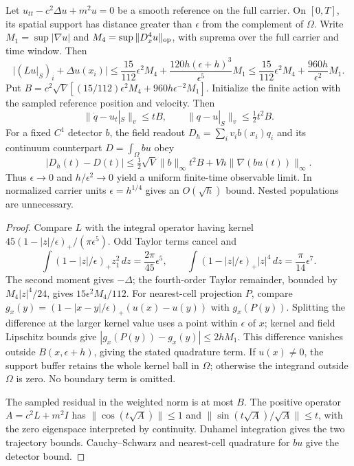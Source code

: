\begin{proposition}
\label{prop:source-metric-scalar-limit}
Let $u_{tt}-c^2\Delta u+m^2u=0$ be a smooth reference on the full carrier.
On $[0,T]$, its spatial support has distance greater than $\epsilon$ from
the complement of $\Omega$. Write
$M_1=\sup|\nabla u|$ and $M_4=\sup\|D_x^4u\|_{\rm op}$, with suprema
over the full carrier and time window. Then
\[
 \big|(Lu|_S)_i+\Delta u(x_i)\big|
 \le \frac{15}{112}\epsilon^2M_4+
     \frac{120h(\epsilon+h)^3}{\epsilon^5}M_1
 \le \frac{15}{112}\epsilon^2M_4+\frac{960h}{\epsilon^2}M_1.
\]
Put $B=c^2\sqrt V[(15/112)\epsilon^2M_4+960h\epsilon^{-2}M_1]$.
Initialize the finite action with the sampled reference position and velocity.
Then
\[
 \|\dot q-u_t|_S\|_v\le tB,\qquad
 \|q-u|_S\|_v\le\tfrac12t^2B.
\]
For a fixed $C^1$ detector $b$, the field readout
$D_h=\sum_i v_ib(x_i)q_i$ and its continuum counterpart
$D=\int_\Omega bu$ obey
\[
 |D_h(t)-D(t)|\le
 \tfrac12\sqrt V\|b\|_\infty t^2B+
 Vh\|\nabla(bu(t))\|_\infty.
\]
Thus $\epsilon\to0$ and $h/\epsilon^2\to0$ yield a uniform finite-time
observable limit. In normalized carrier units $\epsilon=h^{1/4}$ gives
an $O(\sqrt h)$ bound. Nested populations are unnecessary.
\end{proposition}
\begin{proof}
Compare $L$ with the integral operator having kernel
$45(1-|z|/\epsilon)_+/(\pi\epsilon^5)$. Odd Taylor terms cancel and
\[
 \int (1-|z|/\epsilon)_+z_1^2\,dz=\frac{2\pi}{45}\epsilon^5,
 \qquad
 \int (1-|z|/\epsilon)_+|z|^4\,dz=\frac{\pi}{14}\epsilon^7.
\]
The second moment gives $-\Delta$; the fourth-order Taylor remainder,
bounded by $M_4|z|^4/24$, gives $15\epsilon^2M_4/112$.
For nearest-cell projection $P$, compare
$g_x(y)=(1-|x-y|/\epsilon)_+(u(x)-u(y))$ with $g_x(P(y))$.
Splitting the difference at the larger kernel value uses a point within
$\epsilon$ of $x$; kernel and field Lipschitz bounds give
$|g_x(P(y))-g_x(y)|\le2hM_1$. This difference vanishes outside
$B(x,\epsilon+h)$, giving the stated quadrature term. If $u(x)\ne0$,
the support buffer retains the whole kernel ball in $\Omega$; otherwise
the integrand outside $\Omega$ is zero. No boundary term is omitted.

The sampled residual in the weighted norm is at most $B$. The positive
operator $A=c^2L+m^2I$ has
$\|\cos(t\sqrt A)\|\le1$ and
$\|\sin(t\sqrt A)/\sqrt A\|\le t$, with the zero eigenspace interpreted
by continuity. Duhamel integration gives the two trajectory bounds.
Cauchy--Schwarz and nearest-cell quadrature for $bu$ give the detector bound.
\end{proof}

